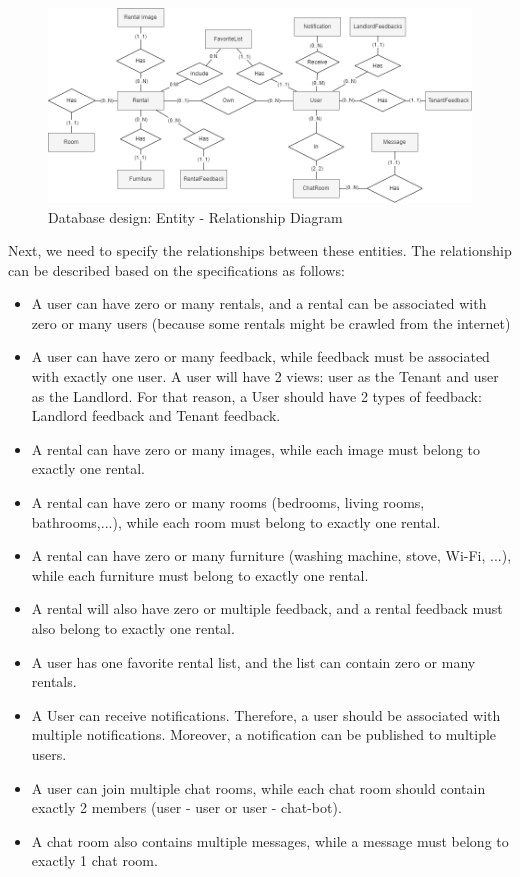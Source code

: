 \begin{figure}[H]
    \centering
    \includegraphics[width=\textwidth]{Images/ERD-Relationship.png}
    \caption{Database design: Entity - Relationship Diagram}
    \label{fig:erd-relationship}
\end{figure}
Next, we need to specify the relationships between these entities. The relationship can be described based on the specifications as follows:
\begin{itemize}
    \item A user can have zero or many rentals, and a rental can be associated with zero or many users (because some rentals might be crawled from the internet)
    \item A user can have zero or many feedback, while feedback must be associated with exactly one user. A user will have 2 views: user as the Tenant and user as the Landlord. For that reason, a User should have 2 types of feedback: Landlord feedback and Tenant feedback.
    \item A rental can have zero or many images, while each image must belong to exactly one rental.
    \item A rental can have zero or many rooms (bedrooms, living rooms, bathrooms,...), while each room must belong to exactly one rental.
    \item A rental can have zero or many furniture (washing machine, stove, Wi-Fi, ...), while each furniture must belong to exactly one rental.
    \item A rental will also have zero or multiple feedback, and a rental feedback must also belong to exactly one rental. 
    \item A user has one favorite rental list, and the list can contain zero or many rentals.
    \item A User can receive notifications. Therefore, a user should be associated with multiple notifications. Moreover, a notification can be published to multiple users.
    \item A user can join multiple chat rooms, while each chat room should contain exactly 2 members (user - user or user - chat-bot).
    \item A chat room also contains multiple messages, while a message must belong to exactly 1 chat room. 
\end{itemize}